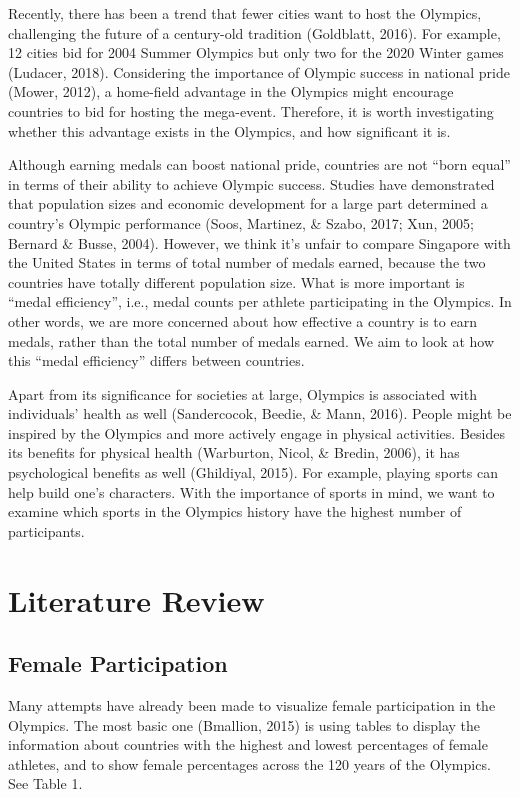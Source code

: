 \documentclass[12pt]{article}
\begin{document}
Recently, there has been a trend that fewer cities want to host the Olympics, challenging the future of a century-old tradition (Goldblatt, 2016). For example, 12 cities bid for 2004 Summer Olympics but only two for the 2020 Winter games (Ludacer, 2018). Considering the importance of Olympic success in national pride (Mower, 2012), a home-field advantage in the Olympics might encourage countries to bid for hosting the mega-event. Therefore, it is worth investigating whether this advantage exists in the Olympics, and how significant it is. 

Although earning medals can boost national pride, countries are not “born equal” in terms of their ability to achieve Olympic success. Studies have demonstrated that population sizes and economic development for a large part determined a country’s Olympic performance (Soos, Martinez, \& Szabo, 2017; Xun, 2005; Bernard \& Busse, 2004). However, we think it’s unfair to compare Singapore with the United States in terms of total number of medals earned, because the two countries have totally different population size. What is more important is “medal efficiency”, i.e., medal counts per athlete participating in the Olympics. In other words, we are more concerned about how effective a country is to earn medals, rather than the total number of medals earned. We aim to look at how this “medal efficiency” differs between countries. 

Apart from its significance for societies at large, Olympics is associated with individuals’ health as well (Sandercocok, Beedie, \&  Mann, 2016). People might be inspired by the Olympics and more actively engage in physical activities. Besides its benefits for physical health (Warburton, Nicol, \& Bredin, 2006), it has psychological benefits as well (Ghildiyal, 2015). For example, playing sports can help build one’s characters. With the importance of sports in mind, we want to examine which sports in the Olympics history have the highest number of participants. 


\section{Literature Review}

\subsection{Female Participation}

Many attempts have already been made to visualize female participation in the Olympics. The most basic one (Bmallion, 2015) is using tables to display the information about countries with the highest and lowest percentages of female athletes, and to show female percentages across the 120 years of the Olympics. See Table 1. 
\end{document}
